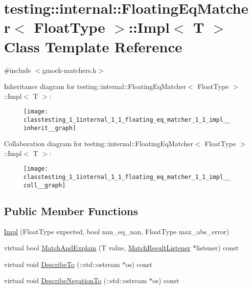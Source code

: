 \hypertarget{classtesting_1_1internal_1_1_floating_eq_matcher_1_1_impl}{}\section{testing\+:\+:internal\+:\+:Floating\+Eq\+Matcher$<$ Float\+Type $>$\+:\+:Impl$<$ T $>$ Class Template Reference}
\label{classtesting_1_1internal_1_1_floating_eq_matcher_1_1_impl}


{\ttfamily \#include $<$gmock-\/matchers.\+h$>$}



Inheritance diagram for testing\+:\+:internal\+:\+:Floating\+Eq\+Matcher$<$ Float\+Type $>$\+:\+:Impl$<$ T $>$\+:
\nopagebreak
\begin{figure}[H]
\begin{center}
\leavevmode
\texttt{[image: classtesting\_1\_1internal\_1\_1\_floating\_eq\_matcher\_1\_1\_impl\_\_inherit\_\_graph]}
\end{center}
\end{figure}


Collaboration diagram for testing\+:\+:internal\+:\+:Floating\+Eq\+Matcher$<$ Float\+Type $>$\+:\+:Impl$<$ T $>$\+:
\nopagebreak
\begin{figure}[H]
\begin{center}
\leavevmode
\texttt{[image: classtesting\_1\_1internal\_1\_1\_floating\_eq\_matcher\_1\_1\_impl\_\_coll\_\_graph]}
\end{center}
\end{figure}
\subsection*{Public Member Functions}
\begin{DoxyCompactItemize}
\item 
\hyperlink{classtesting_1_1internal_1_1_floating_eq_matcher_1_1_impl_a314057e171f872ad478b3e143121aecd}{Impl} (Float\+Type expected, bool nan\+\_\+eq\+\_\+nan, Float\+Type max\+\_\+abs\+\_\+error)
\item 
virtual bool \hyperlink{classtesting_1_1internal_1_1_floating_eq_matcher_1_1_impl_af44c07dae0a5ccf6d9d7cfef077ad678}{Match\+And\+Explain} (T value, \hyperlink{classtesting_1_1_match_result_listener}{Match\+Result\+Listener} $\ast$listener) const 
\item 
virtual void \hyperlink{classtesting_1_1internal_1_1_floating_eq_matcher_1_1_impl_a9cbacc70992f4776a9785716546f13a2}{Describe\+To} (\+::std\+::ostream $\ast$os) const 
\item 
virtual void \hyperlink{classtesting_1_1internal_1_1_floating_eq_matcher_1_1_impl_ab8799175394f311082142850717dabd0}{Describe\+Negation\+To} (\+::std\+::ostream $\ast$os) const 
\end{DoxyCompactItemize}


